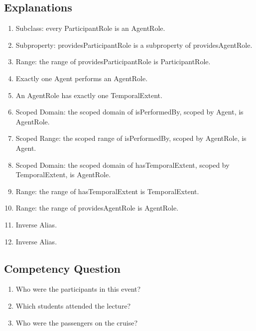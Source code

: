 \subsection{Explanations}
\label{exp:ParticipantRole}
\begin{enumerate}
\item Subclass: every \textsf{ParticipantRole} is an \textsf{AgentRole}.
\item Subproperty: \textsf{providesParticipantRole} is a subproperty of \textsf{providesAgentRole}.
\item Range: the range of \textsf{providesParticipantRole} is \textsf{ParticipantRole}.
\item Exactly one \textsf{Agent} performs an \textsf{AgentRole}.
\item An \textsf{AgentRole} has exactly one \textsf{TemporalExtent}.
\item Scoped Domain: the scoped domain of \textsf{isPerformedBy}, scoped by \textsf{Agent}, is \textsf{AgentRole}.
\item Scoped Range: the scoped range of \textsf{isPerformedBy}, scoped by \textsf{AgentRole}, is \textsf{Agent}. 
\item Scoped Domain: the scoped domain of \textsf{hasTemporalExtent}, scoped by \textsf{TemporalExtent}, is \textsf{AgentRole}.
\item Range: the range of \textsf{hasTemporalExtent} is \textsf{TemporalExtent}.
\item Range:  the range of \textsf{providesAgentRole} is \textsf{AgentRole}.
\item Inverse Alias.
\item Inverse Alias.
\end{enumerate}

\subsection{Competency Question}
\label{cqs:ParticipantRole}
\begin{enumerate}[CQ1.]
\item Who were the participants in this event?
\item Which students attended the lecture?
\item Who were the passengers on the cruise?
\end{enumerate}

\newpage
